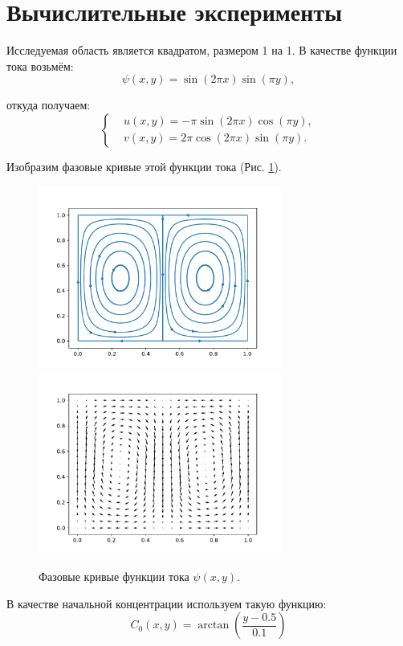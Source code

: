 \section{Вычислительные эксперименты}
    Исследуемая область является квадратом, размером 1 на 1. В качестве функции тока возьмём:
    \[
        \psi(x, y) = \sin (2 \pi x) \sin(\pi y),
    \]

    откуда получаем:
    \[
        \left\{
            \begin{split}
                & u(x, y) = -\pi \sin (2 \pi x) \cos(\pi y), \\
                & v(x, y) = 2\pi \cos (2 \pi x) \sin(\pi y).
            \end{split}
        \right.
    \]

    Изобразим фазовые кривые этой функции тока (Рис. \ref{streamplot}).
    \begin{figure}[H]
        \centering
        \includegraphics[width=8cm]{pictures/streamplot.pdf}
        \includegraphics[width=8cm]{pictures/quiver.pdf}
        \caption{Фазовые кривые функции тока \( \psi(x, y) \).} \label{streamplot}
    \end{figure}

    В качестве начальной концентрации используем такую функцию:
    \[
        C_0(x, y) = \arctan \left( \frac{y - 0.5}{0.1} \right)
    \]

